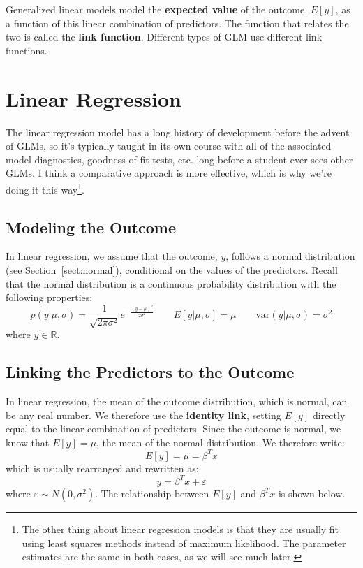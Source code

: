 Generalized linear models model the \textbf{expected value} of the outcome, $E[y]$, as a function of this linear combination of predictors. The function that relates the two is called the \textbf{link function}. Different types of GLM use different link functions.


\section{Linear Regression}

The linear regression model has a long history of development before the advent of GLMs, so it's typically taught in its own course with all of the associated model diagnostics, goodness of fit tests, etc. long before a student ever sees other GLMs. I think a comparative approach is more effective, which is why we're doing it this way\footnote{The other thing about linear regression models is that they are usually fit using least squares methods instead of maximum likelihood. The parameter estimates are the same in both cases, as we will see much later.}.

\subsection{Modeling the Outcome} 

In linear regression, we assume that the outcome, $y$, follows a normal distribution (see Section~\ref{sect:normal}), conditional on the values of the predictors. Recall that the normal distribution is a continuous probability distribution with the following properties:
$$ p(y | \mu, \sigma) = \frac{1}{\sqrt{2 \pi \sigma^2}} e^{-\frac{(y-\mu)^2}{2 \sigma^2}} \qquad  E[y| \mu, \sigma] = \mu \qquad \text{var}(y | \mu, \sigma) = \sigma^2 $$
where $y \in \mathbb{R}$.

\subsection{Linking the Predictors to the Outcome}

In linear regression, the mean of the outcome distribution, which is normal, can be any real number. We therefore use the \textbf{identity link}, setting $E[y]$ directly equal to the linear combination of predictors. Since the outcome is normal, we know that $E[y] = \mu$, the mean of the normal distribution. We therefore write:
\begin{equation} E[y] = \mu = \beta^T x \label{eqn:meanlinear} \end{equation}
which is usually rearranged and rewritten as:
$$ y = \beta^T x + \varepsilon $$
where $\varepsilon \sim N(0, \sigma^2)$. The relationship between $E[y]$ and $\beta^T x$ is shown below.

